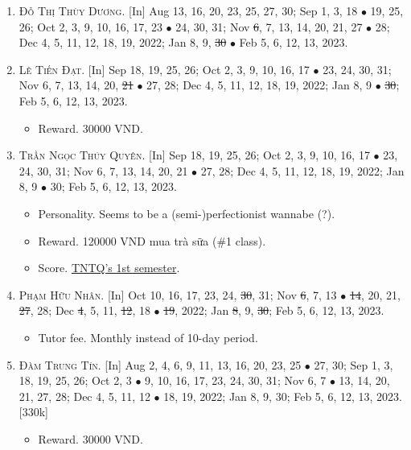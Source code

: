 \documentclass{article}
\numberwithin{equation}{section}
\begin{document}
\begin{enumerate}
	\item \textsc{Đỗ Thị Thùy Dương.} \textsf{[In]} Aug 13, 16, 20, 23, 25, 27, 30; Sep 1, 3, 18 $\bullet$ 19, 25, 26; Oct 2, 3, 9, 10, 16, 17, 23 $\bullet$ 24, 30, 31; Nov \st{6}, 7, 13, 14, 20, 21, 27 $\bullet$ 28; Dec 4, 5, 11, 12, 18, 19, 2022; Jan 8, 9, \st{30} $\bullet$ Feb 5, 6, 12, 13, 2023.
	\item \textsc{Lê Tiến Đạt.} \textsf{[In]} Sep 18, 19, 25, 26; Oct 2, 3, 9, 10, 16, 17 $\bullet$ 23, 24, 30, 31; Nov 6, 7, 13, 14, 20, \st{21} $\bullet$ 27, 28; Dec 4, 5, 11, 12, 18, 19, 2022; Jan 8, 9 $\bullet$ \st{30}; Feb 5, 6, 12, 13, 2023.
	\begin{itemize}
		\item \textsf{Reward.} 30000 VND.
	\end{itemize}
	\item \textsc{Trần Ngọc Thúy Quyên.} \textsf{[In]} Sep 18, 19, 25, 26; Oct 2, 3, 9, 10, 16, 17 $\bullet$ 23, 24, 30, 31; Nov 6, 7, 13, 14, 20, 21 $\bullet$ 27, 28; Dec 4, 5, 11, 12, 18, 19, 2022; Jan 8, 9 $\bullet$ 30; Feb 5, 6, 12, 13, 2023.
	\begin{itemize}
		\item \textsf{Personality.} Seems to be a (semi-)perfectionist wannabe (?).
		\item \textsf{Reward.} 120000 VND mua trà sữa (\#1 class).
		\item \textsf{Score.} \href{https://github.com/NQBH/hobby/blob/master/STEM/student/Tran_Ngoc_Thuy_Quyen_grade_7_1st_semester.jpg}{TNTQ's 1st semester}.
	\end{itemize}
	\item \textsc{Phạm Hữu Nhân.} \textsf{[In]} Oct 10, 16, 17, 23, 24, \st{30}, 31; Nov \st{6}, 7, 13 $\bullet$ \st{14}, 20, 21, \st{27}, 28; Dec \st{4}, 5, 11, \st{12}, 18 $\bullet$ \st{19}, 2022; Jan \st{8}, 9, \st{30}; Feb 5, 6, 12, 13, 2023.
	\begin{itemize}
		\item \textsf{Tutor fee.} Monthly instead of 10-day period.
	\end{itemize}
	\item \textsc{Đàm Trung Tín.} \textsf{[In]} Aug 2, 4, 6, 9, 11, 13, 16, 20, 23, 25 $\bullet$ 27, 30; Sep 1, 3, 18, 19, 25, 26; Oct 2, 3 $\bullet$ 9, 10, 16, 17, 23, 24, 30, 31; Nov 6, 7 $\bullet$ 13, 14, 20, 21, 27, 28; Dec 4, 5, 11, 12 $\bullet$ 18, 19, 2022; Jan 8, 9, 30; Feb 5, 6, 12, 13, 2023. [330k]
	\begin{itemize}
		\item \textsf{Reward.} 30000 VND.
	\end{itemize}
\end{enumerate}
\end{document}
